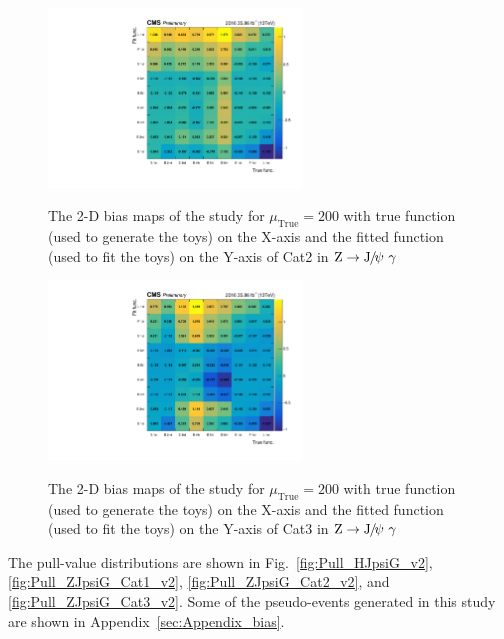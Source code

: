 		\begin{figure}[!ht]
		    \centering
		    \includegraphics[width=0.6\textwidth]{Fig/BiasStudy/BiasTable/ZJpsiG_Cat2/BiasTable_mu200}\\
		    \caption[BiasTable]{\label{fig:BiasTable_zjpsig_Cat2}
		     The 2-D bias maps of the study for $\mu_{\text{True}}=200$ with true function (used to generate the toys) on the X-axis and the fitted function (used to fit the toys) on the Y-axis of Cat2 in $\mathrm{Z}\to{\mathrm{J}\hspace{-.08em}/\hspace{-.14em}\psi}\ \gamma$}
		\end{figure}
		
		\begin{figure}[!ht]
		    \centering
		    \includegraphics[width=0.6\textwidth]{Fig/BiasStudy/BiasTable/ZJpsiG_Cat3/BiasTable_mu200}\\
		    \caption[BiasTable]{\label{fig:BiasTable_zjpsig_Cat3}
		     The 2-D bias maps of the study for $\mu_{\text{True}}=200$ with true function (used to generate the toys) on the X-axis and the fitted function (used to fit the toys) on the Y-axis of Cat3 in $\mathrm{Z}\to{\mathrm{J}\hspace{-.08em}/\hspace{-.14em}\psi}\ \gamma$}
		\end{figure}
		
		The pull-value distributions are shown in Fig.~\ref{fig:Pull_HJpsiG_v2}, \ref{fig:Pull_ZJpsiG_Cat1_v2}, \ref{fig:Pull_ZJpsiG_Cat2_v2}, and \ref{fig:Pull_ZJpsiG_Cat3_v2}.
		Some of the pseudo-events generated in this study are shown in Appendix~\ref{sec:Appendix_bias}.
		
